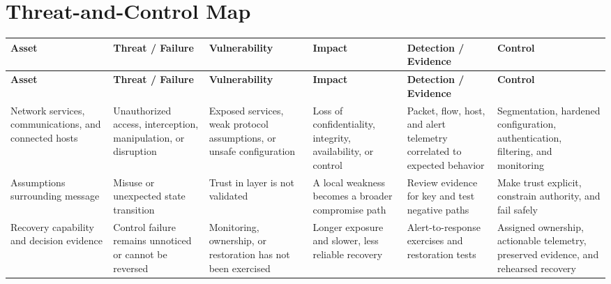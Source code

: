 \documentclass[11pt]{article}
\begin{document}
\section*{Threat-and-Control Map}
\begingroup\scriptsize\setlength{\tabcolsep}{2pt}
\begin{longtable}{>{\RaggedRight\arraybackslash}p{}>{\RaggedRight\arraybackslash}p{}>{\RaggedRight\arraybackslash}p{}>{\RaggedRight\arraybackslash}p{}>{\RaggedRight\arraybackslash}p{}>{\RaggedRight\arraybackslash}p{}}
\toprule\rowcolor{Navy}\color{white}\textbf{Asset} & \color{white}\textbf{Threat / Failure} & \color{white}\textbf{Vulnerability} & \color{white}\textbf{Impact} & \color{white}\textbf{Detection / Evidence} & \color{white}\textbf{Control}\\\midrule
\endfirsthead
\toprule\rowcolor{Navy}\color{white}\textbf{Asset} & \color{white}\textbf{Threat / Failure} & \color{white}\textbf{Vulnerability} & \color{white}\textbf{Impact} & \color{white}\textbf{Detection / Evidence} & \color{white}\textbf{Control}\\\midrule
\endhead
Network services, communications, and connected hosts & Unauthorized access, interception, manipulation, or disruption & Exposed services, weak protocol assumptions, or unsafe configuration & Loss of confidentiality, integrity, availability, or control & Packet, flow, host, and alert telemetry correlated to expected behavior & Segmentation, hardened configuration, authentication, filtering, and monitoring\\\midrule
Assumptions surrounding message & Misuse or unexpected state transition & Trust in layer is not validated & A local weakness becomes a broader compromise path & Review evidence for key and test negative paths & Make trust explicit, constrain authority, and fail safely\\\midrule
Recovery capability and decision evidence & Control failure remains unnoticed or cannot be reversed & Monitoring, ownership, or restoration has not been exercised & Longer exposure and slower, less reliable recovery & Alert-to-response exercises and restoration tests & Assigned ownership, actionable telemetry, preserved evidence, and rehearsed recovery\\\midrule
\bottomrule
\end{longtable}
\endgroup
\end{document}
